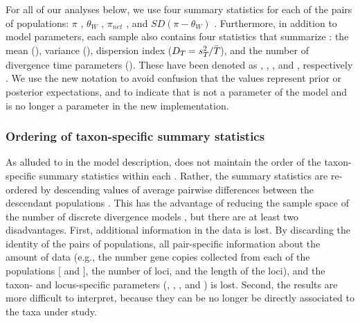 For all of our analyses below, we use four summary statistics for each of
the pairs of populations:
$\pi$ \citep{Tajima1983}, $\theta_W$ \citep{Watterson1975}, $\pi_{net}$
\citep{Takahata1985}, and $SD(\pi-\theta_W)$ \citep{Tajima1989}.
Furthermore, in addition to model parameters, each sample \hpvector{}
also contains four statistics that summarize \divTimeMapVector:
the mean (\divTimeMean), variance (\divTimeVar), dispersion index
($D_{T_{}} = s^{2}_{T_{}}/\bar{T_{}}$), and the number
of divergence time parameters (\divTimeNum).
These have been denoted as \meant{}{}, \vart{}{}, \vmratio{}, and \numt{},
respectively \citep{Hickerson2006,Huang2011,Oaks2012}.
We use the new notation to avoid confusion that the values represent prior or
posterior expectations, and to indicate that \vmratio{} is not a parameter of
the model and \numt{} is no longer a parameter in the new implementation.

\subsubsection*{Ordering of taxon-specific summary statistics}
As alluded to in the model description, \msb does not maintain the order of the
taxon-specific summary statistics \alignmentSS{}{} within each \ssVector{}.
Rather, the summary statistics are re-ordered by descending values of average
pairwise differences between the descendant populations
\citep[$\pi_b$;][]{NeiLi1979,Huang2011}.
This has the advantage of reducing the sample space of the number of discrete
divergence models \divTimeMapVector, but there are at least two disadvantages.
First, additional information in the data is lost.
By discarding the identity of the \npairs{} pairs of populations, all
pair-specific information about the amount of data (e.g., the number gene
copies collected from each of the populations [ and
], the number of loci, and the length of the loci), and the
taxon- and locus-specific parameters (\hkyModel{}{},
\mutationRateScalarConstant{}{}, \ploidyScalar{}{}, and
\locusMutationRateScalar{}) is lost.
Second, the results are more difficult to interpret, because they can be no
longer be directly associated to the taxa under study.

